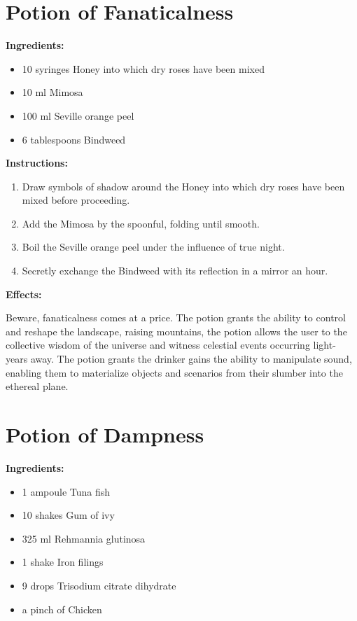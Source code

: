 \documentclass{article}
\begin{document}
\newpage
\section*{Potion of Fanaticalness}

\textbf{Ingredients:}

\begin{itemize}
  \item 10 syringes Honey into which dry roses have been mixed
  \item 10 ml Mimosa
  \item 100 ml Seville orange peel
  \item 6 tablespoons Bindweed
\end{itemize}

\textbf{Instructions:}

\begin{enumerate}
  \item Draw symbols of shadow around the Honey into which dry roses have been mixed before proceeding.
  \item Add the Mimosa by the spoonful, folding until smooth.
  \item Boil the Seville orange peel under the influence of true night.
  \item Secretly exchange the Bindweed with its reflection in a mirror an hour.
\end{enumerate}

\textbf{Effects:}

Beware, fanaticalness comes at a price. The potion grants the ability to control and reshape the landscape, raising mountains, the potion allows the user to the collective wisdom of the universe and witness celestial events occurring light- years away. The potion grants the drinker gains the ability to manipulate sound, enabling them to materialize objects and scenarios from their slumber into the ethereal plane.

\newpage
\section*{Potion of Dampness}

\textbf{Ingredients:}

\begin{itemize}
  \item 1 ampoule Tuna fish
  \item 10 shakes Gum of ivy
  \item 325 ml Rehmannia glutinosa
  \item 1 shake Iron filings
  \item 9 drops Trisodium citrate dihydrate
  \item a pinch of Chicken
\end{itemize}
\end{document}
